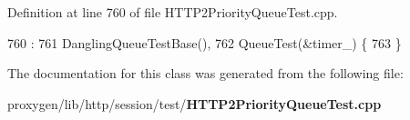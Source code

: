 Definition at line 760 of file H\+T\+T\+P2\+Priority\+Queue\+Test.\+cpp.


\begin{DoxyCode}
760                       :
761     DanglingQueueTestBase(),
762     QueueTest(&timer_) \{
763   \}
\end{DoxyCode}


The documentation for this class was generated from the following file\+:\begin{DoxyCompactItemize}
\item 
proxygen/lib/http/session/test/{\bf H\+T\+T\+P2\+Priority\+Queue\+Test.\+cpp}\end{DoxyCompactItemize}
